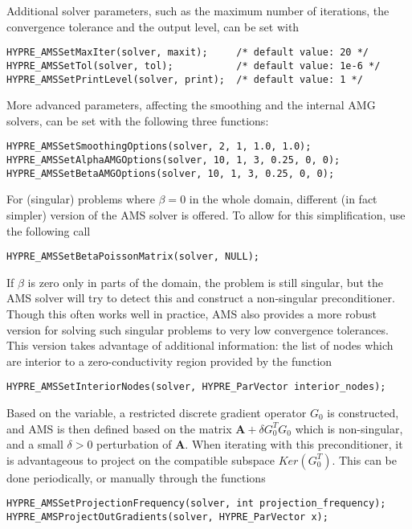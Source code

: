 Additional solver parameters, such as the maximum number of iterations,
the convergence tolerance and the output level, can be set with
\begin{display}\begin{verbatim}
HYPRE_AMSSetMaxIter(solver, maxit);     /* default value: 20 */
HYPRE_AMSSetTol(solver, tol);           /* default value: 1e-6 */
HYPRE_AMSSetPrintLevel(solver, print);  /* default value: 1 */
\end{verbatim}\end{display}

More advanced parameters, affecting the smoothing and the
internal AMG solvers, can be set with the following three
functions:
\begin{display}\begin{verbatim}
HYPRE_AMSSetSmoothingOptions(solver, 2, 1, 1.0, 1.0);
HYPRE_AMSSetAlphaAMGOptions(solver, 10, 1, 3, 0.25, 0, 0);
HYPRE_AMSSetBetaAMGOptions(solver, 10, 1, 3, 0.25, 0, 0);
\end{verbatim}\end{display}

For (singular) problems where $\beta = 0$ in the whole domain,
different (in fact simpler) version of the AMS solver is offered.
To allow for this simplification, use the following \hypre{} call
\begin{display}\begin{verbatim}
HYPRE_AMSSetBetaPoissonMatrix(solver, NULL);
\end{verbatim}\end{display}

If $\beta$ is zero only in parts of the domain, the problem is still singular,
but the AMS solver will try to detect this and construct a non-singular
preconditioner. Though this often works well in practice, AMS also provides a
more robust version for solving such singular problems to very low convergence
tolerances. This version takes advantage of additional information: the list of
nodes which are interior to a zero-conductivity region provided by the function
\begin{display}\begin{verbatim}
HYPRE_AMSSetInteriorNodes(solver, HYPRE_ParVector interior_nodes);
\end{verbatim}\end{display}
Based on the  variable, a restricted discrete gradient
operator $G_0$ is constructed, and AMS is then defined based on the matrix
${\mathbf A}+\delta G_0^TG_0$ which is non-singular, and a small $\delta>0$ perturbation of
${\mathbf A}$. When iterating with this preconditioner, it is advantageous to project on
the compatible subspace $Ker(G_0^T)$. This can be done periodically, or manually
through the functions
\begin{display}\begin{verbatim}
HYPRE_AMSSetProjectionFrequency(solver, int projection_frequency);
HYPRE_AMSProjectOutGradients(solver, HYPRE_ParVector x);
\end{verbatim}\end{display}

